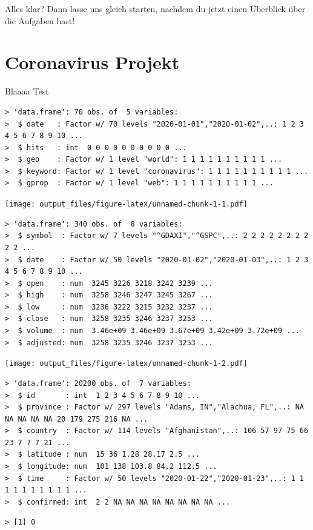 \documentclass[
]{book}
\begin{document}
Alles klar? Dann lasse uns gleich starten, nachdem du jetzt einen Überblick über die Aufgaben hast!

\hypertarget{coronavirus-projekt}{%
\chapter{Coronavirus Projekt}\label{coronavirus-projekt}}

Blaaaa Test

\begin{verbatim}
> 'data.frame': 70 obs. of  5 variables:
>  $ date   : Factor w/ 70 levels "2020-01-01","2020-01-02",..: 1 2 3 4 5 6 7 8 9 10 ...
>  $ hits   : int  0 0 0 0 0 0 0 0 0 0 ...
>  $ geo    : Factor w/ 1 level "world": 1 1 1 1 1 1 1 1 1 1 ...
>  $ keyword: Factor w/ 1 level "coronavirus": 1 1 1 1 1 1 1 1 1 1 ...
>  $ gprop  : Factor w/ 1 level "web": 1 1 1 1 1 1 1 1 1 1 ...
\end{verbatim}

\texttt{[image: output\_files/figure-latex/unnamed-chunk-1-1.pdf]}

\begin{verbatim}
> 'data.frame': 340 obs. of  8 variables:
>  $ symbol  : Factor w/ 7 levels "^GDAXI","^GSPC",..: 2 2 2 2 2 2 2 2 2 2 ...
>  $ date    : Factor w/ 50 levels "2020-01-02","2020-01-03",..: 1 2 3 4 5 6 7 8 9 10 ...
>  $ open    : num  3245 3226 3218 3242 3239 ...
>  $ high    : num  3258 3246 3247 3245 3267 ...
>  $ low     : num  3236 3222 3215 3232 3237 ...
>  $ close   : num  3258 3235 3246 3237 3253 ...
>  $ volume  : num  3.46e+09 3.46e+09 3.67e+09 3.42e+09 3.72e+09 ...
>  $ adjusted: num  3258 3235 3246 3237 3253 ...
\end{verbatim}

\texttt{[image: output\_files/figure-latex/unnamed-chunk-1-2.pdf]}

\begin{verbatim}
> 'data.frame': 20200 obs. of  7 variables:
>  $ id       : int  1 2 3 4 5 6 7 8 9 10 ...
>  $ province : Factor w/ 297 levels "Adams, IN","Alachua, FL",..: NA NA NA NA NA 20 179 275 216 NA ...
>  $ country  : Factor w/ 114 levels "Afghanistan",..: 106 57 97 75 66 23 7 7 7 21 ...
>  $ latitude : num  15 36 1.28 28.17 2.5 ...
>  $ longitude: num  101 138 103.8 84.2 112.5 ...
>  $ time     : Factor w/ 50 levels "2020-01-22","2020-01-23",..: 1 1 1 1 1 1 1 1 1 1 ...
>  $ confirmed: int  2 2 NA NA NA NA NA NA NA NA ...
\end{verbatim}

\begin{verbatim}
> [1] 0
\end{verbatim}
\end{document}
